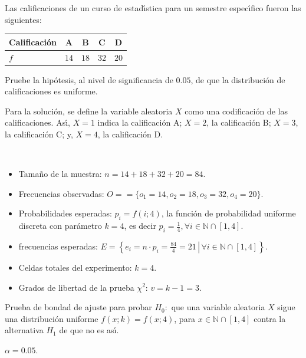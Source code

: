 \begin{enunciado}
 Las calificaciones de un curso de estad\'{\i}stica para un semestre
 espec\'{\i}fico fueron las siguientes:
 \begin{center}
  \begin{tabular}{l|cccc}
   Calificaci\'on & A & B & C & D \\
   \hline
   $f$ & $14$ & $18$ & $32$ & $20$
  \end{tabular}
 \end{center}
 Pruebe la hip\'otesis, al nivel de significancia de $0.05$,
 de que la distribuci\'on de calificaciones es uniforme.
\end{enunciado}

\begin{solucion}
 Para la soluci\'on, se define la variable aleatoria $X$
 como una codificaci\'on de las calificaciones.
 As\'{\i}, $X=1$ indica la calificaci\'on A; $X=2$, la calificaci\'on B;
 $X=3$, la calificaci\'on C; y, $X=4$, la calificaci\'on D.
 \begin{datos}
  $\phantom{0}$
  \begin{itemize}
   \item Tama\~no de la muestra: $n=14+18+32+20=84$.
   \item Frecuencias observadas:
   $O = = \{ o_1 = 14, o_2 = 18, o_3 = 32, o_4 = 20 \}$.
   \item Probabilidades esperadas: $p_i = f(i;4)$,
   la funci\'on de probabilidad uniforme discreta con par\'ametro $k=4$,
   es decir $p_i = \frac{1}{4}, \forall i \in \mathbb{N}\cap[1,4]$.
   \item frecuencias esperadas:
   $E = \left\{ \left. e_i = n\cdot p_i = \frac{84}{4} = 21 \, \right| \, \forall i \in \mathbb{N}\cap[1,4] \right\}$.
   \item Celdas totales del experimento: $k=4$.
   \item Grados de libertad de la prueba $\chi^2$: $v = k-1 = 3$.
  \end{itemize}
 \end{datos}

 \begin{hipotesis}
  Prueba de bondad de ajuste para probar $H_0:$
  que una variable aleatoria $X$ sigue una distribuci\'on uniforme
  $f(x;k) = f(x;4)$, para $x\in\mathbb{N}\cap[1,4]$
  contra la alternativa $H_1$ de que no es as\'{\i}.
 \end{hipotesis}

 \begin{significancia}
  $\alpha = 0.05$.
 \end{significancia}


\end{solucion}
